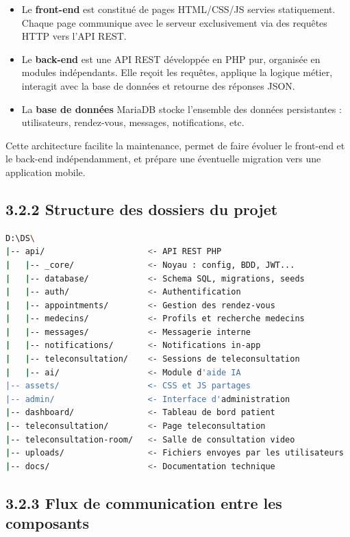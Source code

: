 \documentclass[12pt,a4paper]{report}
\begin{document}
\begin{itemize}
    \item Le \textbf{front-end} est constitu\'e de pages HTML/CSS/JS servies statiquement. Chaque page communique avec le serveur exclusivement via des requ\^etes HTTP vers l'API REST.
    \item Le \textbf{back-end} est une API REST d\'evelopp\'ee en PHP pur, organis\'ee en modules ind\'ependants. Elle re\c{c}oit les requ\^etes, applique la logique m\'etier, interagit avec la base de donn\'ees et retourne des r\'eponses JSON.
    \item La \textbf{base de donn\'ees} MariaDB stocke l'ensemble des donn\'ees persistantes : utilisateurs, rendez-vous, messages, notifications, etc.
\end{itemize}

Cette architecture facilite la maintenance, permet de faire \'evoluer le front-end et le back-end ind\'ependamment, et pr\'epare une \'eventuelle migration vers une application mobile.

\subsection*{3.2.2 Structure des dossiers du projet}

\begin{lstlisting}[language=bash, caption={Structure des dossiers du projet TabibDZ}]
D:\DS\
|-- api/                     <- API REST PHP
|   |-- _core/               <- Noyau : config, BDD, JWT...
|   |-- database/            <- Schema SQL, migrations, seeds
|   |-- auth/                <- Authentification
|   |-- appointments/        <- Gestion des rendez-vous
|   |-- medecins/            <- Profils et recherche medecins
|   |-- messages/            <- Messagerie interne
|   |-- notifications/       <- Notifications in-app
|   |-- teleconsultation/    <- Sessions de teleconsultation
|   |-- ai/                  <- Module d'aide IA
|-- assets/                  <- CSS et JS partages
|-- admin/                   <- Interface d'administration
|-- dashboard/               <- Tableau de bord patient
|-- teleconsultation/        <- Page teleconsultation
|-- teleconsultation-room/   <- Salle de consultation video
|-- uploads/                 <- Fichiers envoyes par les utilisateurs
|-- docs/                    <- Documentation technique
\end{lstlisting}

\subsection*{3.2.3 Flux de communication entre les composants}
\end{document}
